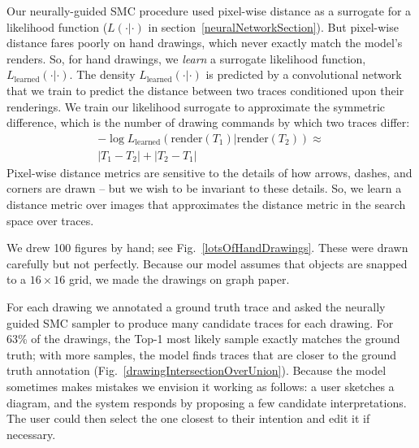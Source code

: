 \documentclass{article}
\begin{document}
Our neurally-guided SMC procedure
used pixel-wise distance as a surrogate for a likelihood function ($L(\cdot|\cdot)$ in section~\ref{neuralNetworkSection}).
But pixel-wise distance fares poorly on hand drawings, which never exactly match
the model's renders.
So, for hand drawings,
we \emph{learn} a surrogate likelihood function,
$L_{\text{learned}}(\cdot|\cdot)$.
The density $L_{\text{learned}}(\cdot|\cdot)$ is predicted by a convolutional network that we train to predict
the distance between two traces conditioned upon their renderings.
We train our likelihood surrogate to approximate the symmetric difference,
which is  the number of drawing commands by which two traces differ:
\begin{multline}
-\log L_{\text{learned}}(\text{render}(T_1)|\text{render}(T_2))\approx\\ |T_1 - T_2| + |T_2 - T_1|\label{symmetricDistance}
\end{multline}
Pixel-wise distance
metrics are sensitive to the details of how
arrows, dashes, and corners are drawn -- but we wish to be invariant
to these details.
So, we learn a distance metric over images that
approximates the distance metric in the search space over traces.


We drew 100 figures by hand; see Fig.~\ref{lotsOfHandDrawings}.
These were drawn carefully but not perfectly.
Because our model assumes that objects are snapped to a $16\times 16$ grid, 
we made the drawings on graph paper.

For each drawing we annotated a ground truth trace and asked the neurally guided SMC sampler
to produce many candidate traces for each drawing.
For 63\% of the drawings, the Top-1 most likely sample exactly matches the
ground truth; with more samples, the model finds traces
that are closer to the ground truth annotation (Fig.~\ref{drawingIntersectionOverUnion}).
Because the model sometimes makes mistakes %
we envision it working as follows:
a user sketches a diagram,
and the system responds by proposing a few candidate interpretations.
The user could then select the one closest to their intention and edit it if necessary.
\end{document}
